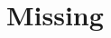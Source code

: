 \documentclass[10pt]{beamer}
\begin{document}
\section{Missing}






%
%
%	
%	
%	
%	
%	
%	
	
\end{document}
